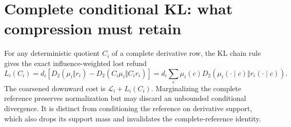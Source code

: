\documentclass[11pt]{article}
\begin{document}
\section{Complete conditional KL: what compression must retain}
\label{sec:compression}
For any deterministic quotient $C_i$ of a complete derivative row,
the KL chain rule gives the exact influence-weighted lost refund
\begin{equation}\label{eq:quotientloss}
 L_i(C_i)=d_i[D_2(\mu_i\Vert r_i)-D_2(C_i\mu_i\Vert C_i r_i)]
 =d_i\sum_c\mu_i(c)D_2(\mu_i(\cdot\mid c)\Vert r_i(\cdot\mid c)).
\end{equation}
The coarsened downward cost is $\mathcal L_i+L_i(C_i)$.
Marginalizing the complete reference preserves normalization but may
discard an unbounded conditional divergence. It is distinct from
conditioning the reference on derivative support, which also drops its
support mass and invalidates the complete-reference identity.
\end{document}
